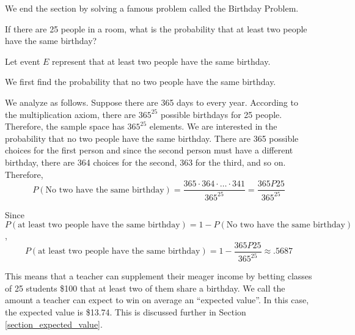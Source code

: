 We end the section by solving a famous problem called the Birthday Problem.

\begin{example}
    If there are 25 people in a room, what is the probability that at least two people have the same birthday?
\end{example}

\begin{solution}
    Let event \( E \) represent that at least two people have the same birthday.

    We first find the probability that no two people have the same birthday.

    We analyze as follows. Suppose there are 365 days to every year. According to the multiplication axiom, there are \( 365^{25} \) possible birthdays for 25 people. Therefore, the sample space has \( 365^{25} \) elements. We are interested in the probability that no two people have the same birthday. There are 365 possible choices for the first person and since the second person must have a different birthday, there are 364 choices for the second, 363 for the third, and so on. Therefore,
    \[ P(\text{No two have the same birthday}) = \frac{365 \cdot 364 \cdot \ldots \cdot 341}{365^{25}} = \frac{365P25}{365^{25}} \]

    Since \( P(\text{at least two people have the same birthday}) = 1 - P(\text{No two have the same birthday}) \),
    \[ P(\text{at least two people have the same birthday}) = 1 - \frac{365P25}{365^{25}} \approx .5687 \]
\end{solution}

This means that a teacher can supplement their meager income by betting classes of 25 students \$100 that at least two of them share a birthday. We call the amount a teacher can expect to win on average an ``expected value''. In this case, the expected value is \$13.74. This is discussed further in Section \ref{section_expected_value}.